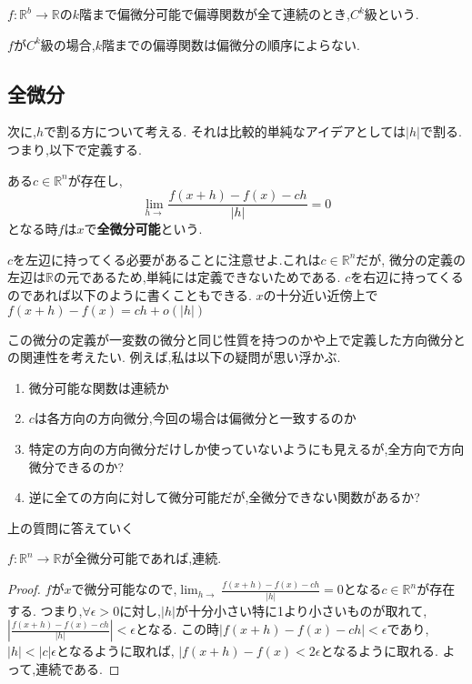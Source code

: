 \begin{dfn}
$f:\mathbb{R}^b \to \mathbb{R}$の$k$階まで偏微分可能で偏導関数が全て連続のとき,$C^k$級という.
\end{dfn}

\begin{prop}
$f$が$C^k$級の場合,$k$階までの偏導関数は偏微分の順序によらない.
\end{prop}

\subsection{全微分}
次に,$h$で割る方について考える.
それは比較的単純なアイデアとしては$|h|$で割る.
つまり,以下で定義する.
\begin{dfn}
ある$c \in \mathbb{R}^n$が存在し,
\begin{equation*}
 \lim_{h \to }\frac{f(x+h) - f(x) - ch}{|h|}  = 0
\end{equation*}
となる時$f$は$x$で\textbf{全微分可能}という.
\end{dfn}
$c$を左辺に持ってくる必要があることに注意せよ.これは$c \in \mathbb{R}^n$だが,
微分の定義の左辺は$\mathbb{R}$の元であるため,単純には定義できないためである.
$c$を右辺に持ってくるのであれば以下のように書くこともできる.
$x$の十分近い近傍上で$f(x+h)-f(x) = ch + o(|h|)$

この微分の定義が一変数の微分と同じ性質を持つのかや上で定義した方向微分との関連性を考えたい.
例えば,私は以下の疑問が思い浮かぶ.

\begin{enumerate}
  \item 微分可能な関数は連続か
  \item $c$は各方向の方向微分,今回の場合は偏微分と一致するのか
  \item 特定の方向の方向微分だけしか使っていないようにも見えるが,全方向で方向微分できるのか?
  \item 逆に全ての方向に対して微分可能だが,全微分できない関数があるか?
\end{enumerate}
上の質問に答えていく

\begin{lem}
$f: \mathbb{R}^n \to \mathbb{R}$が全微分可能であれば,連続.
\end{lem}
\begin{proof}
$f$が$x$で微分可能なので,$\lim_{h \to }\frac{f(x+h) - f(x) - ch}{|h|}  = 0$となる$c \in \mathbb{R}^n$が存在する.
つまり,$\forall \epsilon > 0$に対し,$|h|$が十分小さい特に1より小さいものが取れて,
$|\frac{f(x+h) - f(x) - ch}{|h|}| < \epsilon$となる.
この時$|f(x+h) - f(x) - ch| < \epsilon$であり,$|h| < |c|\epsilon$となるように取れば,
$|f(x+h) - f(x) < 2\epsilon$となるように取れる.
よって,連続である.
\end{proof}



